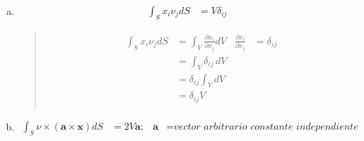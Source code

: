\documentclass[a4paper,10pt,twoside,final,spanish]{article}
\begin{document}
\begin{enumerate}[a.]
\item \begin{align*}
\int_{S}x_{i}\nu_{j}dS &= V\delta_{ij}
\end{align*}

\begin{quote}
\begin{tcolorbox}[colback=gray!10!white,colframe=black!0!white]

\begin{align*}
\int_{S}x_{i}\nu_{j}dS &= \int_{V}\frac{\partial x_{i}}{\partial x_{j}}dV 
& \frac{\partial x_{i}}{\partial x_{j}} &= \delta_{ij} \\
&= \int_{V}\delta_{ij}\,dV \\ 
&= \delta_{ij}\int_{V}dV \\
&= \delta_{ij}V \\
\end{align*}

\end{tcolorbox}
\end{quote}

\item \begin{align*}
\int_{S}\nu\times(\mathbf{a}\times\mathbf{x})dS &= 2V\mathbf{a};
& \mathbf{a} &= \textit{vector arbitrario constante independiente de x}
\end{align*}

\begin{quote}
\begin{tcolorbox}[colback=gray!10!white,colframe=black!0!white]


\end{tcolorbox}
\end{quote}
\end{enumerate}
\end{document}
